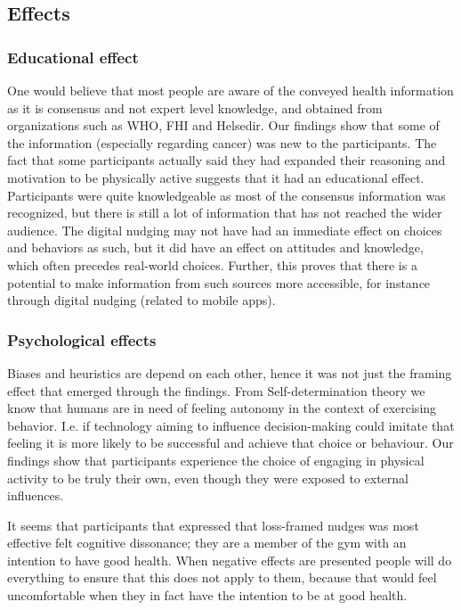 \subsection{Effects}
\subsubsection{Educational effect}
One would believe that most people are aware of the conveyed health information as it is consensus and not expert level knowledge, and obtained from organizations such as WHO, FHI and Helsedir. Our findings show that some of the information (especially regarding cancer) was new to the participants. The fact that some participants actually said they had expanded their reasoning and motivation to be physically active suggests that it had an educational effect. Participants were quite knowledgeable as most of the consensus information was recognized, but there is still a lot of information that has not reached the wider audience. The digital nudging may not have had an immediate effect on choices and behaviors as such, but it did have an effect on attitudes and knowledge, which often precedes real-world choices. Further, this proves that there is a potential to make information from such sources more accessible, for instance through digital nudging (related to mobile apps). 

\subsubsection{Psychological effects}
Biases and heuristics are depend on each other, hence it was not just the framing effect that emerged through the findings. From Self-determination theory we know that humans are in need of feeling autonomy in the context of exercising behavior. I.e. if technology aiming to influence decision-making could imitate that feeling it is more likely to be successful and achieve that choice or behaviour. Our findings show that participants experience the choice of engaging in physical activity to be truly their own, even though they were exposed to external influences. 

It seems that participants that expressed that loss-framed nudges was most effective felt cognitive dissonance; they are a member of the gym with an intention to have good health. When negative effects are presented people will do everything to ensure that this does not apply to them, because that would feel uncomfortable when they in fact have the intention to be at good health. 

